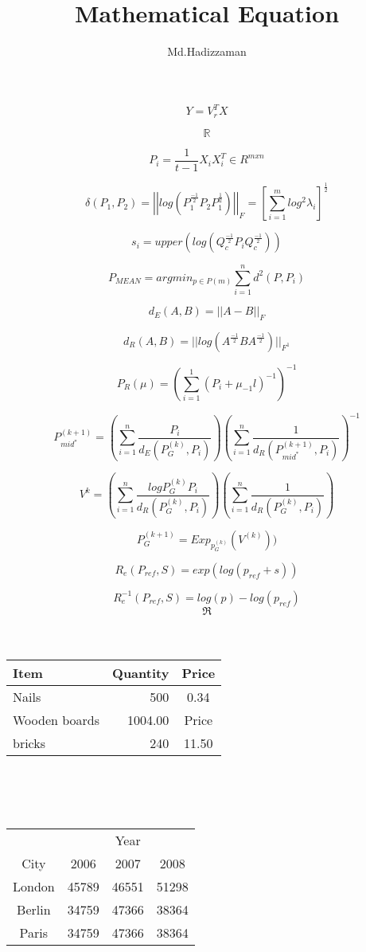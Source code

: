 \documentclass[a4paper,20pt]{book}
\title{Mathematical  Equation}
\author{Md.Hadizzaman}
\begin{document}
	
\maketitle
	$$Y=V_r^TX$$
	
	$$ \mathbb{R}$$
	
	$$P_i=\frac{1}{t-1}X_iX_i^T \in R^{mxn}$$
	
	$$ \delta(P_1,P_2)=\left|\left|log(P_1^\frac{-1}{2}P_2P_1^\frac{1}{2})\right|\right|_F =[ \sum_{i=1}^m log^2\lambda_i]^{\frac{1}{2}}$$
	
	$$s_i=upper\left(log(Q_c^{\frac{-1}{2}} P_iQ_c^{\frac{-1}{2}})\right) $$   %
	
	$$P_{MEAN}=argmin_{p\in P(m)}\sum_{i=1}^nd^2(P,P_i) $$
	
	$$d_E(A,B)=||A-B||_F $$
	
	$$d_R(A,B)=||log(A^{\frac{-1}{2}}BA^{\frac{-1}{2}}) ||_{F^1} $$
	
	$$P_R(\mu)=(\sum_{i=1}^1(P_i+\mu_{-1}l)^{-1})^{-1} $$
	
	$$P_{mid^*}^{(k+1)}=(\sum_{i=1}^n \frac{P_i}{d_E(P_G^{(k)},P_i)} )
	(\sum_{i=1}^n\frac{1}{d_R(P_{mid^*}^{(k+1)},P_i)} )^{-1} $$
	
	$$V^k=(\sum_{i=1}^n \frac{logP_G^{(k)}P_i}{d_R(P_G^{(k)},P_i)}) (\sum_{i=1}^n \frac{1}{d_R(P_G^{(k)},P_i)}) $$
	
	
	$$P_G^{(k+1)}= Exp_{p_G^{(k)}}(V^{(k)}))$$
	
	$$R_e(P_{ref},S)=exp(log(p_{ref}+s))  $$
	
	$$R_e^{-1}(P_{ref},S)=log(p)-log(p_{ref}) $$
	$$ \Re $$
\\
\\
	
	\begin{tabular}{l|r|c}
		Item&Quantity&Price\\
		\hline
		Nails&500&0.34\\
		Wooden boards&1004.00&Price\\
		bricks&240&11.50\\
		
	\end{tabular}
\\
\\
\\

\begin{tabular}{c| c c c}
	& & Year& \\
	\cline{2-4}
	City&2006& 2007& 2008\\
	\hline
	London&45789&46551&51298\\
	\hline
	Berlin&34759&47366&38364\\
		\hline
	Paris&34759&47366&38364\\

  

\end{tabular}
\\
\\
\\
\end{document}
